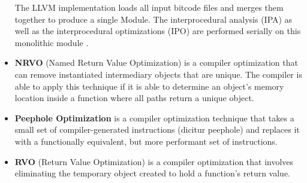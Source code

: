 \begin{itemize}
    The LLVM implementation loads all input bitcode files and merges them together
    to produce a single Module. The interprocedural analysis (IPA) as well as the
    interprocedural optimizations (IPO) are performed serially on this monolithic
    module \autocite{johnson2016}.
    \item \textbf{NRVO} (Named Return Value Optimization) is a compiler optimization
    that can remove instantiated intermediary objects that are unique. The compiler
    is able to apply this technique if it is able to determine an object's memory
    location inside a function where all paths return a unique object.
    \item \textbf{Peephole Optimization} is a compiler optimization technique that
    takes a small set of compiler-generated instructions (dicitur peephole) and
    replaces it with a functionally equivalent, but more performant set of instructions.
    \item \textbf{RVO} (Return Value Optimization) is a compiler optimization that
    involves eliminating the temporary object created to hold a function's return
    value.
\end{itemize}